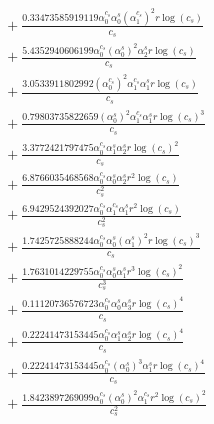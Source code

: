 \documentclass[10pt]{article}
\begin{document}
\begin{align*}
&{}  + \frac{0.33473585919119 \alpha_{0}^{c_s} \alpha_{0}^s \left(\alpha_{1}^{c_s}\right)^{2} r \log{\left(c_{s} \right)}}{c_{s}} \\
&{}  + \frac{5.4352940606199 \alpha_{0}^{c_s} \left(\alpha_{0}^s\right)^{2} \alpha_{2}^s r \log{\left(c_{s} \right)}}{c_{s}} \\
&{}  + \frac{3.0533911802992 \left(\alpha_{0}^{c_s}\right)^{2} \alpha_{1}^{c_s} \alpha_{1}^s r \log{\left(c_{s} \right)}}{c_{s}} \\
&{}  + \frac{0.79803735822659 \left(\alpha_{0}^s\right)^{2} \alpha_{1}^{c_s} \alpha_{1}^s r \log{\left(c_{s} \right)}^{3}}{c_{s}} \\
&{}  + \frac{3.3772421797475 \alpha_{0}^{c_s} \alpha_{1}^s \alpha_{2}^s r \log{\left(c_{s} \right)}^{2}}{c_{s}} \\
&{}  + \frac{6.8766035468568 \alpha_{0}^{c_s} \alpha_{0}^s \alpha_{2}^s r^{2} \log{\left(c_{s} \right)}}{c_{s}^{2}} \\
&{}  + \frac{6.9429524392027 \alpha_{0}^{c_s} \alpha_{1}^{c_s} \alpha_{1}^s r^{2} \log{\left(c_{s} \right)}}{c_{s}^{2}} \\
&{}  + \frac{1.7425725888244 \alpha_{0}^{c_s} \alpha_{0}^s \left(\alpha_{1}^s\right)^{2} r \log{\left(c_{s} \right)}^{3}}{c_{s}} \\
&{}  + \frac{1.7631014229755 \alpha_{0}^{c_s} \alpha_{0}^s \alpha_{1}^s r^{3} \log{\left(c_{s} \right)}^{2}}{c_{s}^{3}} \\
&{}  + \frac{0.11120736576723 \alpha_{0}^{c_s} \alpha_{0}^s \alpha_{3}^s r \log{\left(c_{s} \right)}^{4}}{c_{s}} \\
&{}  + \frac{0.22241473153445 \alpha_{0}^{c_s} \alpha_{1}^s \alpha_{2}^s r \log{\left(c_{s} \right)}^{4}}{c_{s}} \\
&{}  + \frac{0.22241473153445 \alpha_{0}^{c_s} \left(\alpha_{0}^s\right)^{3} \alpha_{1}^s r \log{\left(c_{s} \right)}^{4}}{c_{s}} \\
&{}  + \frac{1.8423897269099 \alpha_{0}^{c_s} \left(\alpha_{0}^s\right)^{2} \alpha_{1}^{c_s} r^{2} \log{\left(c_{s} \right)}^{2}}{c_{s}^{2}}
\end{align*}
\end{document}
